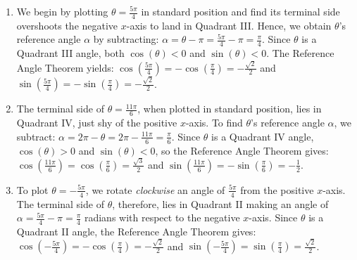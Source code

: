 {
\begin{enumerate}

\item  We begin by plotting $\theta = \frac{5\pi}{4}$ in standard position and find its terminal side overshoots the negative $x$-axis to land in Quadrant III.  Hence, we obtain $\theta$'s reference angle $\alpha$ by subtracting: $\alpha = \theta - \pi = \frac{5\pi}{4} - \pi = \frac{\pi}{4}$.  Since $\theta$ is a Quadrant III angle, both $\cos(\theta) < 0$ and $\sin(\theta) < 0$.  The Reference Angle Theorem yields: $\cos\left(\frac{5\pi}{4}\right) = -\cos\left(\frac{\pi}{4}\right) = -\frac{\sqrt{2}}{2}$ and $\sin\left(\frac{5\pi}{4}\right) = - \sin\left(\frac{\pi}{4}\right) = -\frac{\sqrt{2}}{2}$.

\item The terminal side of  $\theta = \frac{11\pi}{6}$, when plotted in standard position, lies in Quadrant IV, just shy of the positive $x$-axis.  To find $\theta$'s reference angle $\alpha$, we subtract:  $\alpha = 2\pi - \theta = 2\pi - \frac{11 \pi}{6} = \frac{\pi}{6}$.  Since $\theta$ is a Quadrant IV angle, $\cos(\theta) > 0$ and $\sin(\theta) < 0$, so the Reference Angle Theorem gives: $\cos\left(\frac{11 \pi}{6} \right) = \cos\left(\frac{\pi}{6} \right) = \frac{\sqrt{3}}{2}$ and $\sin\left(\frac{11\pi}{6}\right) = -\sin\left(\frac{\pi}{6}\right) =  -\frac{1}{2}$.



\item  To plot $\theta = -\frac{5\pi}{4}$, we rotate \textit{clockwise} an angle of $\frac{5 \pi}{4}$ from the positive $x$-axis.  The terminal side of $\theta$, therefore, lies in Quadrant II making an angle of $\alpha = \frac{5 \pi}{4} - \pi = \frac{\pi}{4}$ radians with respect to the negative $x$-axis.   Since $\theta$ is a Quadrant II angle, the Reference Angle Theorem gives:   $\cos\left(-\frac{5 \pi}{4}\right) = -\cos\left(\frac{\pi}{4}\right) = -\frac{\sqrt{2}}{2}$ and $\sin\left(-\frac{5 \pi}{4}\right) = \sin\left(\frac{\pi}{4}\right) = \frac{\sqrt{2}}{2}$. 


\end{enumerate}}
